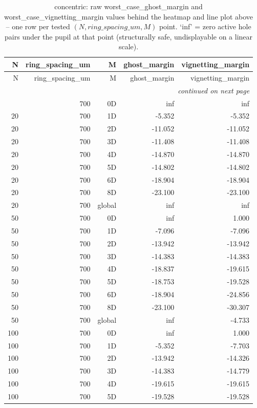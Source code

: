\begin{longtable}{rrrrr}
\caption{concentric: raw worst\_case\_ghost\_margin and worst\_case\_vignetting\_margin values behind the heatmap and line plot above -- one row per tested $(N, ring\_spacing\_um, M)$ point. `inf' = zero active hole pairs under the pupil at that point (structurally safe, undisplayable on a linear scale).} \\
\toprule
N & ring\_spacing\_um & M & ghost\_margin & vignetting\_margin \\
\midrule
\endfirsthead
\toprule
N & ring\_spacing\_um & M & ghost\_margin & vignetting\_margin \\
\midrule
\endhead
\midrule
\multicolumn{5}{r}{\itshape continued on next page} \\
\endfoot
\bottomrule
\endlastfoot
20 & 700 & 0D & inf & inf \\
20 & 700 & 1D & -5.352 & -5.352 \\
20 & 700 & 2D & -11.052 & -11.052 \\
20 & 700 & 3D & -11.408 & -11.408 \\
20 & 700 & 4D & -14.870 & -14.870 \\
20 & 700 & 5D & -14.802 & -14.802 \\
20 & 700 & 6D & -18.904 & -18.904 \\
20 & 700 & 8D & -23.100 & -23.100 \\
20 & 700 & global & inf & inf \\
50 & 700 & 0D & inf & 1.000 \\
50 & 700 & 1D & -7.096 & -7.096 \\
50 & 700 & 2D & -13.942 & -13.942 \\
50 & 700 & 3D & -14.383 & -14.383 \\
50 & 700 & 4D & -18.837 & -19.615 \\
50 & 700 & 5D & -18.753 & -19.528 \\
50 & 700 & 6D & -18.904 & -24.856 \\
50 & 700 & 8D & -23.100 & -30.307 \\
50 & 700 & global & inf & -4.733 \\
100 & 700 & 0D & inf & 1.000 \\
100 & 700 & 1D & -5.352 & -7.703 \\
100 & 700 & 2D & -13.942 & -14.326 \\
100 & 700 & 3D & -14.383 & -14.779 \\
100 & 700 & 4D & -19.615 & -19.615 \\
100 & 700 & 5D & -19.528 & -19.528 \\

\end{longtable}
